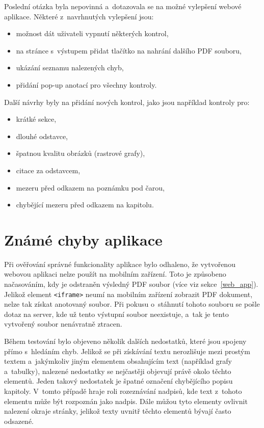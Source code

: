 Poslední otázka byla nepovinná a~dotazovala se na možné vylepšení webové
aplikace. Některé z~navrhnutých vylepšení jsou:
\begin{itemize}
    \item možnost dát uživateli vypnutí některých kontrol,
    \item na stránce s~výstupem přidat tlačítko na nahrání dalšího PDF souboru,
    \item ukázání seznamu nalezených chyb,
    \item přidání pop-up anotací pro všechny kontroly.
\end{itemize}
Další návrhy byly na přidání nových kontrol, jako jsou například kontroly pro:
\begin{itemize}
    \item krátké sekce,
    \item dlouhé odstavce,
    \item špatnou kvalitu obrázků (rastrové grafy),
    \item citace za odstavcem,
    \item mezeru před odkazem na poznámku pod čarou,
    \item chybějící mezeru před odkazem na kapitolu.
\end{itemize}



\section{Známé chyby aplikace} \label{app_errors}
Při ověřování správné funkcionality aplikace bylo odhaleno, že vytvořenou webovou aplikaci
nelze použít na mobilním zařízení. Toto je způsobeno načasováním, kdy je odstraněn
výsledný PDF soubor (více viz sekce~\ref{web_app}). Jelikož element
\texttt{<iframe>} neumí na mobilním zařízení zobrazit PDF dokument, nelze tak
získat anotovaný soubor. Při pokusu o~stáhnutí tohoto souboru se pošle dotaz
na server, kde už tento výstupní soubor neexistuje, a~tak je tento vytvořený soubor
nenávratně ztracen.

Během testování bylo objeveno několik dalších nedostatků, které jsou spojeny přímo
s~hledáním chyb. Jelikož se při získávání textu nerozlišuje mezi prostým textem
a~jakýmkoliv jiným elementem obsahujícím text (například grafy a~tabulky),
nalezené nedostatky se nejčastěji objevují právě okolo těchto elementů. 
Jeden takový nedostatek je špatné označení chybějícího popisu kapitoly.
V~tomto případě hraje roli rozeznávání nadpisů, kde text z~tohoto elementu
může být rozpoznán jako nadpis. Dále můžou tyto elementy ovlivnit nalezení
okraje stránky, jelikož texty uvnitř těchto elementů bývají často odsazené.

